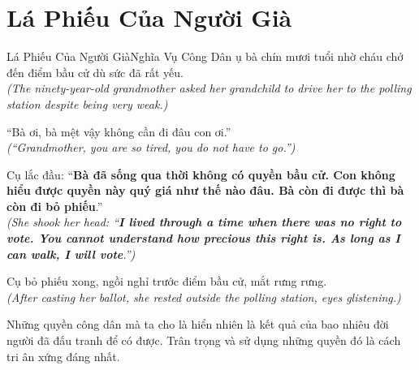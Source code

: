 \section{Lá Phiếu Của Người Già}
\begin{truyen}{Lá Phiếu Của Người Già}{Nghĩa Vụ Công Dân}
ụ bà chín mươi tuổi nhờ cháu chở đến điểm bầu cử dù sức đã rất yếu.\\
\textit{(The ninety-year-old grandmother asked her grandchild to drive her to the polling station despite being very weak.)}

``Bà ơi, bà mệt vậy không cần đi đâu con ơi.''\\
\textit{(``Grandmother, you are so tired, you do not have to go.'')}

Cụ lắc đầu: ``\textbf{Bà đã sống qua thời không có quyền bầu cử. Con không hiểu được quyền này quý giá như thế nào đâu. Bà còn đi được thì bà còn đi bỏ phiếu}.''\\
\textit{(She shook her head: ``\textbf{I lived through a time when there was no right to vote. You cannot understand how precious this right is. As long as I can walk, I will vote}.'')}

Cụ bỏ phiếu xong, ngồi nghỉ trước điểm bầu cử, mắt rưng rưng.\\
\textit{(After casting her ballot, she rested outside the polling station, eyes glistening.)}
\end{truyen}
\begin{baihoc}
  Những quyền công dân mà ta cho là hiển nhiên là kết quả của bao nhiêu đời người đã đấu tranh để có được. Trân trọng và sử dụng những quyền đó là cách tri ân xứng đáng nhất.
\end{baihoc}

